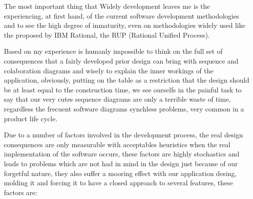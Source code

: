 \maketitle

The most important thing that Widely \cite{widely} development leaves me is the experiencing, at first hand, of the current software development methodologies and to see the high degree of inmaturity, even on methodologies widely used like the proposed by IBM Rational, the RUP \cite{rup} (Rational Unified Process). \newline

Based on my experience is humanly impossible to think on the full set of consequences that a fairly developed prior design can bring with sequence and colaboration diagrams and wisely to explain the inner workings of the application, obviously, putting on the table as a restriction that the design should be at least equal to the construction time, we see ourselfs in the painful task to say that our very cutes sequence diagrams are only a terrible waste of time, regardless the frecuent software  diagrams synchless problems, very common in a product life cycle.

Due to a number of factors involved in the development process, the real design consequences are only measurable with acceptables heuristics when the real implementation of the software occurs, these factors are highly stochastics and leads to problems which are not had in mind in the design just because of our forgetful nature, they also suffer a mooring effect with our application desing, molding it and forcing it to have a closed approach to several features, these factors are: \newline

